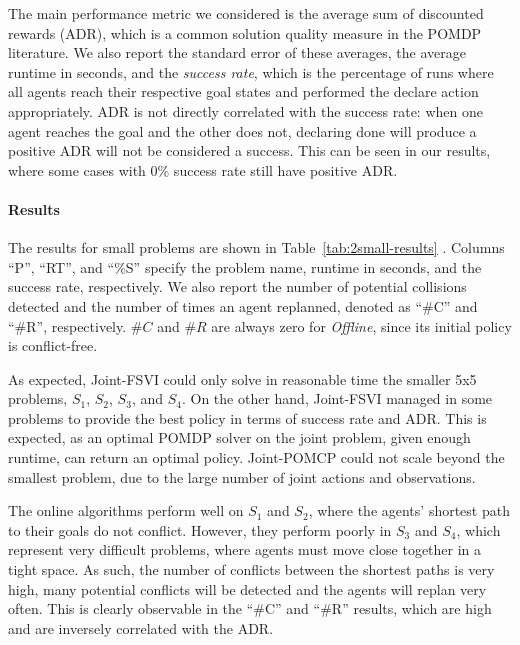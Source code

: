 \documentclass[letterpaper]{article} %
\begin{document}
The main performance metric we considered is the average sum of discounted rewards (ADR), which is a common solution quality measure in the POMDP literature.
We also report the standard error of these averages, the average runtime in seconds,
and the \emph{success rate}, which is the percentage of runs where all agents reach their respective goal states and performed the declare action appropriately.
ADR is not directly correlated with the success rate: when one agent reaches the goal and the other does not, declaring done will produce a positive ADR will not be considered a success. This can be seen in our results, where some cases with 0\% success rate still have positive ADR.







\paragraph{Results}

The results for small problems are shown in Table~\ref{tab:2small-results} .
Columns ``P'', ``RT'', and ``\%S'' specify the problem name, runtime in seconds, and the success rate, respectively.
We also report the number of potential collisions detected and the number of times an agent replanned, denoted as ``\#C'' and ``\#R'', respectively.
$\#C$ and $\#R$ are always zero for \emph{Offline}, since its initial policy is conflict-free. %

As expected, Joint-FSVI could only solve in reasonable time the smaller 5x5 problems, $S_1$, $S_2$, $S_3$, and $S_4$. On the other hand, Joint-FSVI managed in some problems to provide the best policy in terms of success rate and ADR. This is expected, as an optimal POMDP solver on the joint problem, given enough runtime, can return an optimal policy. Joint-POMCP could not scale beyond  the smallest problem, due to the large number of joint actions and observations.



The online algorithms perform well on $S_1$ and $S_2$, where the agents' shortest path to their goals do not conflict.
However, they perform poorly in $S_3$ and $S_4$, which represent very difficult problems, where agents must move close together in a tight space. As such, the number of conflicts between the shortest paths is very high, many potential conflicts will be detected and the agents will replan very often. This is clearly observable in the ``\#C'' and ``\#R'' results, which are high and are inversely correlated with the ADR.
\end{document}
